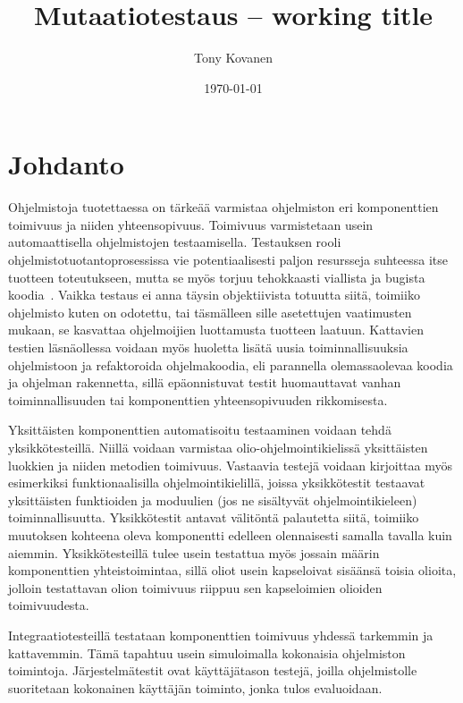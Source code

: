 \documentclass[finnish]{tktltiki2}
\title{Mutaatiotestaus -- working title}
\author{Tony Kovanen}
\date{\today}
\begin{document}
\frontmatter

\maketitle
\makeabstract

\tableofcontents
\newpage

\section{Johdanto}
Ohjelmistoja tuotettaessa on tärkeää varmistaa ohjelmiston eri komponenttien toimivuus ja niiden yhteensopivuus. Toimivuus varmistetaan usein automaattisella ohjelmistojen testaamisella. Testauksen rooli ohjelmistotuotantoprosessissa vie potentiaalisesti paljon resursseja suhteessa itse tuotteen toteutukseen, mutta se myös torjuu tehokkaasti viallista ja bugista koodia~\cite{SchulerZ10}. Vaikka testaus ei anna täysin objektiivista totuutta siitä, toimiiko ohjelmisto kuten on odotettu, tai täsmälleen sille asetettujen vaatimusten mukaan, se kasvattaa ohjelmoijien luottamusta tuotteen laatuun. Kattavien testien läsnäollessa voidaan myös huoletta lisätä uusia toiminnallisuuksia ohjelmistoon ja refaktoroida ohjelmakoodia, eli parannella olemassaolevaa koodia ja ohjelman rakennetta, sillä epäonnistuvat testit huomauttavat vanhan toiminnallisuuden tai komponenttien yhteensopivuuden rikkomisesta. 

Yksittäisten komponenttien automatisoitu testaaminen voidaan tehdä yksikkötesteillä. Niillä voidaan varmistaa olio-ohjelmointikielissä yksittäisten luokkien ja niiden metodien toimivuus. Vastaavia testejä voidaan kirjoittaa myös esimerkiksi funktionaalisilla ohjelmointikielillä, joissa yksikkötestit testaavat yksittäisten funktioiden ja moduulien (jos ne sisältyvät ohjelmointikieleen) toiminnallisuutta. Yksikkötestit antavat välitöntä palautetta siitä, toimiiko muutoksen kohteena oleva komponentti edelleen olennaisesti samalla tavalla kuin aiemmin. Yksikkötesteillä tulee usein testattua myös jossain määrin komponenttien yhteistoimintaa, sillä oliot usein kapseloivat sisäänsä toisia olioita, jolloin testattavan olion toimivuus riippuu sen kapseloimien olioiden toimivuudesta. 

Integraatiotesteillä testataan komponenttien toimivuus yhdessä tarkemmin ja kattavemmin. Tämä tapahtuu usein simuloimalla kokonaisia ohjelmiston toimintoja. Järjestelmätestit ovat käyttäjätason testejä, joilla ohjelmistolle suoritetaan kokonainen käyttäjän toiminto, jonka tulos evaluoidaan. 
\end{document}
